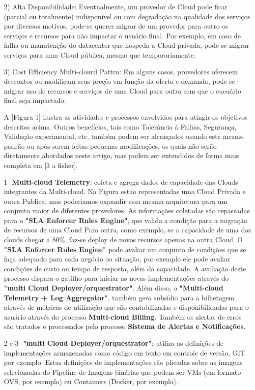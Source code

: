 \documentclass[12pt]{article}
\begin{document}
	2) Alta Disponibilidade: Eventualmente, um provedor de Cloud pode ficar (parcial ou totalmente) indisponível ou com degradação na qualidade dos serviços por diversos motivos, pode-se querer migrar de um provedor para outro os serviços e recursos para não impactar o usuário final. Por exemplo, em caso de falha ou manutenção do datacenter que hospeda a Cloud privada, pode-se migrar serviços para uma Cloud pública, mesmo que temporariamente.
	   
	3) Cost Efficiency Multi-clourd Pattrn: Em alguns casos, provedores oferecem descontos ou modificam seus preçõs em função da oferta e demanda, pode-se migrar uso de recursos e serviços de uma Cloud para outra sem que o cucuário final seja impactado.
	
	A [Figura 1] ilustra as atividades e processos envolvidos para atingir os objetivos descritos acima. Outros benefícios, tais como Tolerância à Falhas, Segurança, Validação experimental, etc, também podem ser alcançados usando este mesmo padrão ou após serem feitas pequenas modificações, os quais não serão diretamente abordados neste artigo, mas podem ser entendidos de forma mais completa em [3 a fisher].
	
	1- \textbf{Multi-cloud Telemetry}: coleta e agrega dados de capacidade das Clouds integrantes da Multi-cloud. Na Figura estao representadas uma Cloud Privada e outra Publica, mas poderiamos expandir essa mesma arquitetura para um conjunto maior de diferentes provedores. As informações coletadas são repassadas para o \textbf{"SLA Enforcer Rules Engine"}, que valida a condição para a migração de recursos de uma Cloud Para outra, como exemplo, se a capacidade de uma das clouds chegar a 80\%, faz-se deploy de novos recursos apenas na outra Cloud. O \textbf{"SLA Enforcer Rules Engine"} pode avaliar um conjunto de condições que se faça adequado para cada negócio ou situação, por exemplo ele pode avaliar condições de custo ou tempo de resposta, além da capacidade. A avaliação deste processo dispara o gatilho para iniciar as novas implementações através do \textbf{"multi Cloud Deployer/orquestrator"}. Além disso, o \textbf{"Multi-cloud Telemetry + Log Aggregator"}, também gera subsídio para a bilhetagem através de métricas de utilização que são contabilizadas e disponibilidadas para o usuário através do processo \textbf{Multi-cloud Billing}. Também os alertas de erros são tratados e processados pelo processo \textbf{Sistema de Alertas e Notificações}.
	
	2 e 3- \textbf{"multi Cloud Deployer/orquestrator"}: utiliza as definições de implementações armazenadas como código em texto em controle de versão, GIT por exemplo. Estas definições de implementações são plicadas sobre as imagens selecionadas do Pipeline de Imagens binárias que podem ser VMs (em formato OVS, por exemplo) ou Containers (Docker, por exemplo).
	
\end{document}
